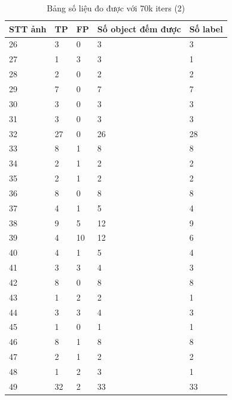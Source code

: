\begin{table}[H]
    \begin{tabular}{p{2cm}  p{2cm}  p{2cm} p{4cm} p{2cm} }
    \hline		
	STT ảnh & TP & FP & Số object đếm được & Số label\\
	\hline
	26  & 3  & 0  &     3     &   3   \\     
	\hline
	27  & 1  & 3  &     3     &   1   \\     
	\hline
	28  & 2  & 0  &     2     &   2   \\     
	\hline
	29  & 7  & 0  &     7     &   7   \\     
	\hline
	30  & 3  & 0  &     3     &   3   \\     
	\hline
	31  & 3  & 0  &     3     &   3   \\     
	\hline
	32  & 27 & 0  &     26    &   28  \\     
	\hline
	33  & 8  & 1  &     8     &   8   \\     
	\hline
	34  & 2  & 1  &     2     &   2   \\     
	\hline
	35  & 2  & 1  &     2     &   2   \\     
	\hline
	36  & 8  & 0  &     8     &   8   \\     
	\hline
	37  & 4  & 1  &     5     &   4   \\     
	\hline
	38  & 9  & 5  &     12    &   9   \\     
	\hline
	39  & 4  & 10 &     12    &   6   \\     
	\hline
	40  & 4  & 1  &     5     &   4   \\     
	\hline
	41  & 3  & 3  &     4     &   3   \\     
	\hline
	42  & 8  & 0  &     8     &   8   \\     
	\hline
	43  & 1  & 2  &     2     &   1   \\     
	\hline
	44  & 3  & 3  &     4     &   3   \\     
	\hline
	45  & 1  & 0  &     1     &   1   \\     
	\hline
	46  & 8  & 1  &     8     &   8   \\     
	\hline
	47  & 2  & 1  &     2     &   2   \\     
	\hline
	48  & 1  & 2  &     3     &   1   \\     
	\hline
	49  & 32 & 2  &     33    &   33  \\     
	\hline

	\end{tabular}
	\caption{Bảng số liệu đo được với 70k iters (2)}
    \label{chap3:case1:table01}    
\end{table}

